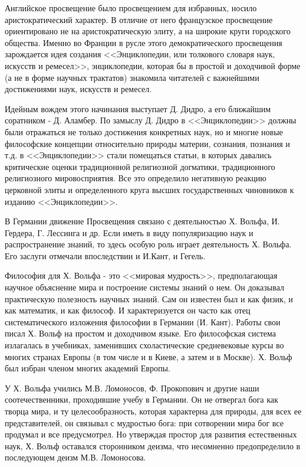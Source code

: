 \documentclass[12pt,a4paper]{article}
\begin{document}
	Английское просвещение было просвещением для избранных, носило аристократический характер. В отличие от него французское просвещение ориентировано не на аристократическую элиту, а на широкие круги городского общества. Именно во Франции в русле этого демократического просвещения зарождается идея создания <<Энциклопедии, или толкового словаря наук, искусств и ремесел>>, энциклопедии, которая бы в простой и доходчивой форме (а не в форме научных трактатов) знакомила читателей с важнейшими достижениями наук, искусств и ремесел.
	
	Идейным вождем этого начинания выступает Д. Дидро, а его ближайшим соратником - Д. Аламбер. По замыслу Д. Дидро в <<Энциклопедии>> должны были отражаться не только достижения конкретных наук, но и многие новые философские концепции относительно природы материи, сознания, познания и т.д. в <<Энциклопедии>> стали помещаться статьи, в которых давались критические оценки традиционной религиозной догматики, традиционного религиозного мировосприятия. Все это определило негативную реакцию церковной элиты и определенного круга высших государственных чиновников к изданию <<Энциклопедии>>.
	
	В Германии движение Просвещения связано с деятельностью Х. Вольфа, И. Гердера, Г. Лессинга и др. Если иметь в виду популяризацию наук и распространение знаний, то здесь особую роль играет деятельность Х. Вольфа. Его заслуги отмечали впоследствии и И.Кант, и Гегель.
	
	Философия для Х. Вольфа - это <<мировая мудрость>>, предполагающая научное объяснение мира и построение системы знаний о нем. Он доказывал практическую полезность научных знаний. Сам он известен был и как физик, и как математик, и как философ. И характеризуется он часто как отец систематического изложения философии в Германии (И. Кант). Работы свои писал Х. Вольф на простом и доходчивом языке. Его философская система излагалась в учебниках, заменивших схоластические средневековые курсы во многих странах Европы (в том числе и в Киеве, а затем и в Москве). Х. Вольф был избран членом многих академий Европы.
	
	У Х. Вольфа учились М.В. Ломоносов, Ф. Прокопович и другие наши соотечественники, проходившие учебу в Германии. Он не отвергал бога как творца мира, и ту целесообразность, которая характерна для природы, для всех ее представителей, он связывал с мудростью бога: при сотворении мира бог все продумал и все предусмотрел. Но утверждая простор для развития естественных наук, Х. Вольф оставался сторонником деизма, что несомненно предопределило в последующем деизм М.В. Ломоносова.
	
\end{document}

